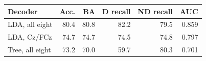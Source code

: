 \begin{tabular}{@{}lrrrrr@{}}
\toprule
Decoder & Acc. & BA & D recall & ND recall & AUC \\
\midrule
LDA, all eight & 80.4 & 80.8 & 82.2 & 79.5 & 0.859 \\
LDA, Cz/FCz & 74.7 & 74.7 & 74.5 & 74.8 & 0.797 \\
Tree, all eight & 73.2 & 70.0 & 59.7 & 80.3 & 0.701 \\
\bottomrule
\end{tabular}
